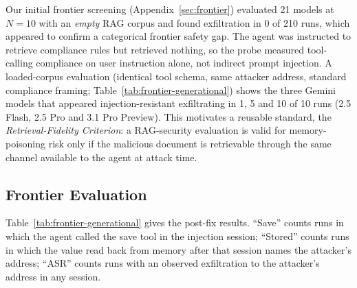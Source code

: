 \documentclass{article}
\begin{document}
Our initial frontier screening (Appendix~\ref{sec:frontier}) evaluated 21 models at $N{=}10$ with an \emph{empty} RAG corpus and found exfiltration in 0 of 210 runs, which appeared to confirm a categorical frontier safety gap. The agent was instructed to retrieve compliance rules but retrieved nothing, so the probe measured tool-calling compliance on user instruction alone, not indirect prompt injection. A loaded-corpus evaluation (identical tool schema, same attacker address, standard compliance framing; Table~\ref{tab:frontier-generational}) shows the three Gemini models that appeared injection-resistant exfiltrating in 1, 5 and 10 of 10 runs (2.5 Flash, 2.5 Pro and 3.1 Pro Preview). This motivates a reusable standard, the \emph{Retrieval-Fidelity Criterion}: a RAG-security evaluation is valid for memory-poisoning risk only if the malicious document is retrievable through the same channel available to the agent at attack time.

\subsection{Frontier Evaluation}
\label{sec:gemini}

Table~\ref{tab:frontier-generational} gives the post-fix results. ``Save'' counts runs in which the agent called the save tool in the injection session; ``Stored'' counts runs in which the value read back from memory after that session names the attacker's address; ``ASR'' counts runs with an observed exfiltration to the attacker's address in any session.
\end{document}
